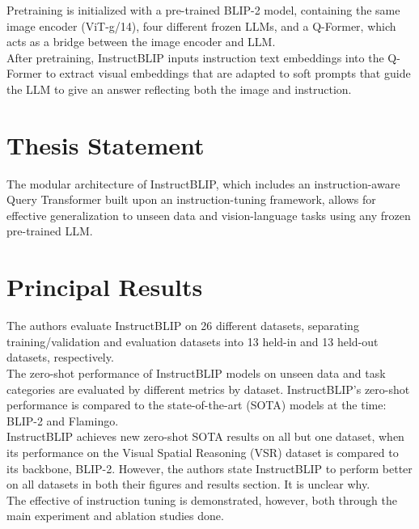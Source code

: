 \documentclass[12pt, letterpaper]{article}
\begin{document}
\begin{spacing}{1.10}
Pretraining is initialized with a pre-trained BLIP-2 model, containing the same image encoder (ViT-g/14), four different frozen LLMs, and a Q-Former, which acts as a bridge between the image encoder and LLM.\\

After pretraining, InstructBLIP inputs instruction text embeddings into the Q-Former to extract visual embeddings that are adapted to soft prompts that guide the LLM to give an answer reflecting both the image and instruction.

\section{Thesis Statement}
\label{sec:thesis}
\leavevmode\par\noindent
The modular architecture of InstructBLIP, which includes an instruction-aware Query Transformer built upon an instruction-tuning framework, allows for effective generalization to unseen data and vision-language tasks using any frozen pre-trained LLM.

\section{Principal Results}
\label{sec:principal}
\leavevmode\par\noindent
The authors evaluate InstructBLIP on 26 different datasets, separating training/validation and evaluation datasets into 13 held-in and 13 held-out datasets, respectively.\\

The zero-shot performance of InstructBLIP models on unseen data and task categories are evaluated by different metrics by dataset. InstructBLIP's zero-shot performance is compared to the state-of-the-art (SOTA) models at the time: BLIP-2 and Flamingo. \\

InstructBLIP achieves new zero-shot SOTA results on all but one dataset, when its performance on the Visual Spatial Reasoning (VSR) dataset is compared to its backbone, BLIP-2. However, the authors state InstructBLIP to perform better on all datasets in both their figures and results section. It is unclear why.\\

The effective of instruction tuning is demonstrated, however, both through the main experiment and ablation studies done.\\


\end{spacing}
\end{document}
